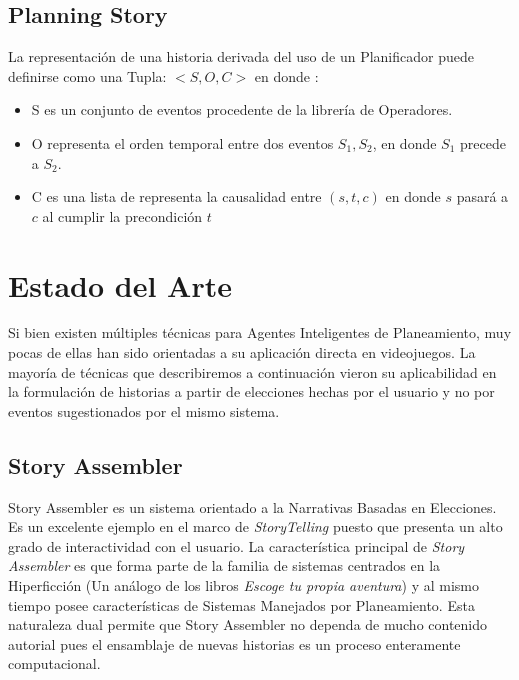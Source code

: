 \subsection{Planning Story}

La representación de una historia derivada del uso de un Planificador puede definirse como una Tupla: $<S, O, C>$ en donde :

\begin{itemize}
\item S es un conjunto de eventos procedente de la librería de Operadores.
\item O representa el orden temporal entre dos eventos $S_1, S_2$, en donde $S_1$ precede a $S_2$.
\item C es una lista de representa la causalidad entre $(s, t, c )$ en donde $s$ pasará a $c$ al cumplir la precondición $t$

\end{itemize}

\section{Estado del Arte}

Si bien existen múltiples técnicas para Agentes Inteligentes de Planeamiento, muy pocas de ellas han sido orientadas a su aplicación directa en videojuegos. La mayoría de técnicas que describiremos a continuación vieron su aplicabilidad en la formulación de historias a partir de elecciones hechas por el usuario y no por eventos sugestionados por el mismo sistema.

\subsection{Story Assembler}

Story Assembler \cite{garbe2019storyassembler} es un sistema orientado a la Narrativas Basadas en Elecciones. Es un excelente ejemplo en el marco de \textit{StoryTelling} puesto que presenta un alto grado de interactividad con el usuario. La característica principal de \textit{Story Assembler} es que forma parte de la familia de sistemas centrados en la Hiperficción (Un análogo de los libros \textit{Escoge tu propia aventura}) y al mismo tiempo posee características de Sistemas Manejados por Planeamiento. Esta naturaleza dual permite que Story Assembler no dependa de mucho contenido autorial pues el ensamblaje de nuevas historias es un proceso enteramente computacional.

